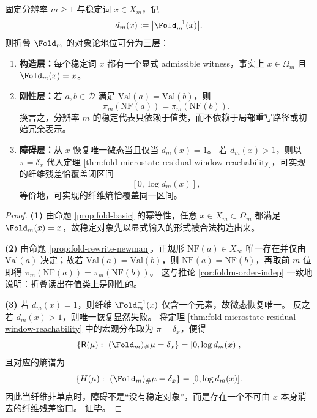\begin{theorem}\label{thm:fold-constructibility-rigidity-obstruction}
固定分辨率 \(m\ge 1\) 与稳定词 \(x\in X_m\)，记
\[
d_m(x):=\bigl|\Fold_m^{-1}(x)\bigr|.
\]
则折叠 \(\Fold_m\) 的对象论地位可分为三层：
\begin{enumerate}
  \item \textbf{构造层：}每个稳定词 \(x\) 都有一个显式 admissible witness，事实上 \(x\in\Omega_m\) 且 \(\Fold_m(x)=x\)。
  \item \textbf{刚性层：}若 \(a,b\in\mathcal D\) 满足 \(\mathrm{Val}(a)=\mathrm{Val}(b)\)，则
  \[
  \pi_m(\mathrm{NF}(a))=\pi_m(\mathrm{NF}(b)).
  \]
  换言之，分辨率 \(m\) 的稳定代表只依赖于值类，而不依赖于局部重写路径或初始冗余表示。
  \item \textbf{障碍层：}从 \(x\) 恢复唯一微态当且仅当 \(d_m(x)=1\)。
  若 \(d_m(x)>1\)，则以 \(\pi=\delta_x\) 代入定理 \ref{thm:fold-microstate-residual-window-reachability}，可实现的纤维残差恰覆盖闭区间
  \[
  [0,\log d_m(x)],
  \]
  等价地，可实现的纤维熵恰覆盖同一区间。
\end{enumerate}
\end{theorem}
\begin{proof}
\textbf{(1)} 由命题 \ref{prop:fold-basic} 的幂等性，任意 \(x\in X_m\subset\Omega_m\) 都满足 \(\Fold_m(x)=x\)，故稳定对象先以显式输入的形式被合法构造出来。

\textbf{(2)} 由命题 \ref{prop:fold-rewrite-newman}，正规形 \(\mathrm{NF}(a)\in X_\infty\) 唯一存在并仅由 \(\mathrm{Val}(a)\) 决定；故若 \(\mathrm{Val}(a)=\mathrm{Val}(b)\)，则 \(\mathrm{NF}(a)=\mathrm{NF}(b)\)，再取前 \(m\) 位即得
\(
\pi_m(\mathrm{NF}(a))=\pi_m(\mathrm{NF}(b))
\)。
这与推论 \ref{cor:foldm-order-indep} 一致地说明：折叠读出在值类上是刚性的。

\textbf{(3)} 若 \(d_m(x)=1\)，则纤维 \(\Fold_m^{-1}(x)\) 仅含一个元素，故微态恢复唯一。
反之若 \(d_m(x)>1\)，则唯一恢复显然失败。
将定理 \ref{thm:fold-microstate-residual-window-reachability} 中的宏观分布取为 \(\pi=\delta_x\)，便得
\[
\{\mathsf R(\mu):\ (\Fold_m)_{\#}\mu=\delta_x\}=[0,\log d_m(x)],
\]
且对应的熵谱为
\[
\{H(\mu):\ (\Fold_m)_{\#}\mu=\delta_x\}=[0,\log d_m(x)].
\]
因此当纤维非单点时，障碍不是“没有稳定对象”，而是存在一个不可由 \(x\) 本身消去的纤维残差窗口。
证毕。
\end{proof}



